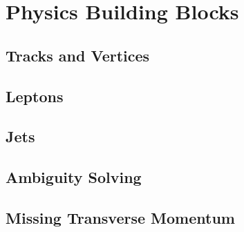 \chapter{Physics Building Blocks}
\label{chap:objects}

\section{Tracks and Vertices}

\section{Leptons}

\section{Jets}

\section{Ambiguity Solving}

\section{Missing Transverse Momentum}
